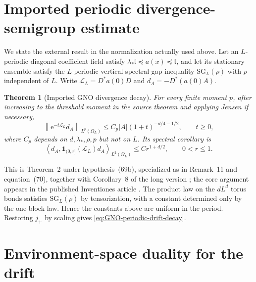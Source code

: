 \documentclass[11pt]{article}
\newtheorem{theorem}{Theorem}[section]
\theoremstyle{definition}
\theoremstyle{remark}
\newcommand{\e}{\mathrm e}
\newcommand{\Id}{\mathbb I}
\newcommand{\ip}[2]{\left\langle #1,#2\right\rangle}
\newcommand{\norm}[1]{\left\lVert #1\right\rVert}
\newcommand{\abs}[1]{\left\lvert #1\right\rvert}
\begin{document}
\section{Imported periodic divergence-semigroup estimate}
\label{app:GNO-input}

We state the external result in the normalization actually used above.  Let an
$L$-periodic diagonal coefficient field satisfy
$\lambda_*\Id\preceq a(x)\preceq\Id$, and let its stationary ensemble satisfy
the $L$-periodic vertical spectral-gap inequality $\mathrm{SG}_L(\rho)$ with
$\rho$ independent of $L$.  Write
$\mathscr L_L=D^*a(0)D$ and
$d_A=-D^*(a(0)A)$.

\begin{theorem}[Imported GNO divergence decay]
\label{thm:GNO-imported-divergence}
For every finite moment $p$, after increasing to the threshold moment in the
source theorem and applying Jensen if necessary,
\begin{equation}
 \norm{\e^{-t\mathscr L_L}d_A}_{L^p(\Omega_L)}
 \le C_p\abs A(1+t)^{-d/4-1/2},\qquad t\ge0,
 \label{eq:GNO-imported-divergence}
\end{equation}
where $C_p$ depends on $d,\lambda_*,\rho,p$ but not on $L$.  Its spectral
corollary is
\begin{equation}
 \ip{d_A}{\bm1_{(0,r]}(\mathscr L_L)d_A}_{L^2(\Omega_L)}
 \le Cr^{1+d/2},\qquad 0<r\le1.
 \label{eq:GNO-imported-spectral-edge}
\end{equation}
\end{theorem}

This is Theorem~2 under hypothesis~(69b), specialized as in Remark~11 and
equation~(70), together with Corollary~8 of the long version
\cite{GloriaNeukammOtto2013Long}; the core argument appears in the published
Inventiones article \cite{GloriaNeukammOtto2015}.  The product law on the
$dL^d$ torus bonds satisfies $\mathrm{SG}_L(\rho)$ by tensorization, with a
constant determined only by the one-block law.  Hence the constants above are
uniform in the period.  Restoring $j_+$ by scaling gives
\eqref{eq:GNO-periodic-drift-decay}.

\section{Environment-space duality for the drift}
\label{app:environment}
\end{document}
